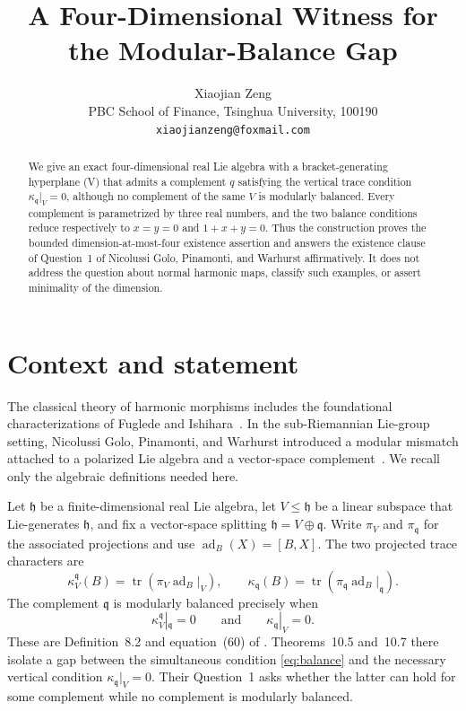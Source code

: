 \documentclass[11pt]{article}
\title{A Four-Dimensional Witness for the Modular-Balance Gap}
\author{Xiaojian Zeng\\
PBC School of Finance, Tsinghua University, 100190\\
\texttt{xiaojianzeng@foxmail.com}}
\date{}
\newcommand{\h}{\mathfrak{h}}
\newcommand{\q}{\mathfrak{q}}
\newcommand{\ad}{\operatorname{ad}}
\newcommand{\tr}{\operatorname{tr}}
\begin{document}
\maketitle

\begin{abstract}
We give an exact four-dimensional real Lie algebra with a bracket-generating
hyperplane (V) that admits a complement \(q\) satisfying the vertical
trace condition \(\kappa_{\q}|_V=0\), although no complement of the same
\(V\) is modularly balanced.  Every complement is parametrized by three real
numbers, and the two balance conditions reduce respectively to
\(x=y=0\) and \(1+x+y=0\).  Thus the construction proves the bounded
dimension-at-most-four existence assertion and answers the existence clause
of Question~1 of Nicolussi Golo, Pinamonti, and Warhurst affirmatively.  It
does not address the question about normal harmonic maps, classify such
examples, or assert minimality of the dimension.
\end{abstract}

\section{Context and statement}

The classical theory of harmonic morphisms includes the foundational
characterizations of Fuglede and Ishihara~\cite{Fuglede1978,Ishihara1979}.  In the
sub-Riemannian Lie-group setting, Nicolussi Golo, Pinamonti, and
Warhurst introduced a modular mismatch attached to a polarized Lie algebra
and a vector-space complement~\cite{NicolussiGoloPinamontiWarhurst2026}.
We recall only the algebraic definitions needed here.

Let \(\h\) be a finite-dimensional real Lie algebra, let \(V\leq\h\) be a
linear subspace that Lie-generates \(\h\), and fix a vector-space splitting
\(\h=V\oplus\q\).  Write \(\pi_V\) and \(\pi_{\q}\) for the associated
projections and use \(\ad_B(X)=[B,X]\).  The two projected trace characters
are
\begin{equation}\label{eq:characters}
 \kappa_V^{\q}(B)=\tr\!\left(\pi_V\ad_B|_V\right),
 \qquad
 \kappa_{\q}(B)=\tr\!\left(\pi_{\q}\ad_B|_{\q}\right).
\end{equation}
The complement \(\q\) is modularly balanced precisely when
\begin{equation}\label{eq:balance}
 \kappa_V^{\q}|_{\q}=0
 \qquad\text{and}\qquad
 \kappa_{\q}|_V=0.
\end{equation}
These are Definition~8.2 and equation~(60) of
\cite{NicolussiGoloPinamontiWarhurst2026}.  Theorems~10.5 and~10.7 there
isolate a gap between the simultaneous condition \eqref{eq:balance} and the
necessary vertical condition \(\kappa_{\q}|_V=0\).  Their Question~1 asks
whether the latter can hold for some complement while no complement is
modularly balanced.
\end{document}
